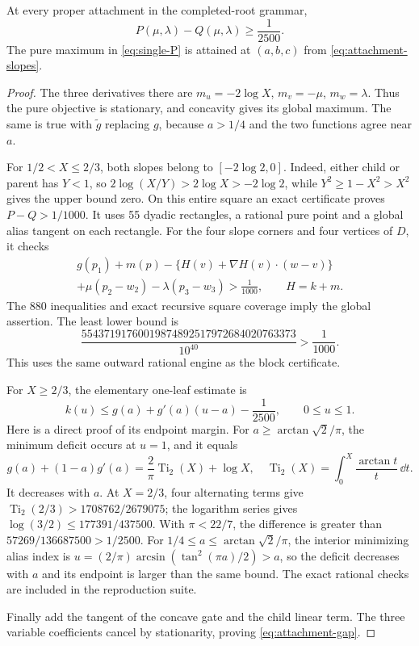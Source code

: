 \begin{lemma}\label{lem:attachment-gap}
At every proper attachment in the completed-root grammar,
\begin{equation}\label{eq:attachment-gap}
 P(\mu,\lambda)-Q(\mu,\lambda)\ge\frac1{2500}.
\end{equation}
The pure maximum in \eqref{eq:single-P} is attained at $(a,b,c)$ from \eqref{eq:attachment-slopes}.
\end{lemma}
\begin{proof}
The three derivatives there are $m_u=-2\log X$, $m_v=-\mu$, $m_w=\lambda$. Thus the pure objective is stationary, and concavity gives its global maximum. The same is true with $\widetilde g$ replacing $g$, because $a>1/4$ and the two functions agree near $a$.

For $1/2<X\le2/3$, both slopes belong to $[-2\log2,0]$. Indeed, either child or parent has $Y<1$, so $2\log(X/Y)>2\log X>-2\log2$, while $Y^2\ge1-X^2>X^2$ gives the upper bound zero. On this entire square an exact certificate proves $P-Q>1/1000$. It uses 55 dyadic rectangles, a rational pure point and a global alias tangent on each rectangle. For the four slope corners and four vertices of $D$, it checks
\begin{multline}\label{eq:single-certificate}
 g(p_1)+m(p)-\{H(v)+\nabla H(v)\cdot(w-v)\}\\
 +\mu(p_2-w_2)-\lambda(p_3-w_3)>\frac1{1000},
 \qquad H=k+m.
\end{multline}
The 880 inequalities and exact recursive square coverage imply the global assertion. The least lower bound is
\[
 \frac{55437191760019874892517972684020763373}{10^{40}}
 >\frac1{1000}.
\]
This uses the same outward rational engine as the block certificate.

For $X\ge2/3$, the elementary one-leaf estimate is
\begin{equation}\label{eq:leaf-tangent-certificate}
 k(u)\le g(a)+g'(a)(u-a)-\frac1{2500},\qquad 0\le u\le1.
\end{equation}
Here is a direct proof of its endpoint margin. For $a\ge\arctan\sqrt2/\pi$, the minimum deficit occurs at $u=1$, and it equals
\[
 g(a)+(1-a)g'(a)=\frac2\pi\operatorname{Ti}_2(X)+\log X,
 \quad \operatorname{Ti}_2(X)=\int_0^X\frac{\arctan t}{t}\,\dd t.
\]
It decreases with $a$. At $X=2/3$, four alternating terms give
$\operatorname{Ti}_2(2/3)>1708762/2679075$; the logarithm series gives
$\log(3/2)\le177391/437500$. With $\pi<22/7$, the difference is greater than $57269/136687500>1/2500$. For $1/4\le a\le\arctan\sqrt2/\pi$, the interior minimizing alias index is
$u=(2/\pi)\arcsin(\tan^2(\pi a)/2)>a$, so the deficit decreases with $a$ and its endpoint is larger than the same bound. The exact rational checks are included in the reproduction suite.

Finally add the tangent of the concave gate and the child linear term. The three variable coefficients cancel by stationarity, proving \eqref{eq:attachment-gap}.
\end{proof}

